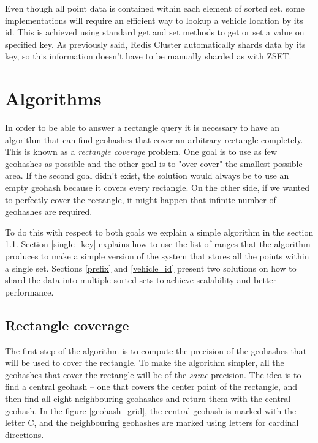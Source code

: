 \documentclass[times, utf8, diplomski]{fer}
\begin{document}
Even though all point data is contained within each element of sorted set, some implementations will require an efficient way to lookup a vehicle location by its id. This is achieved using standard get and set methods to get or set a value on specified key. As previously said, Redis Cluster automatically shards data by its key, so this information doesn't have to be manually sharded as with ZSET.

\chapter {Algorithms} \label {algorithms}
In order to be able to answer a rectangle query it is necessary to have an algorithm that can find geohashes that cover an arbitrary rectangle completely. This is known as a \emph{rectangle coverage} problem. One goal is to use as few geohashes as possible and the other goal is to "over cover" the smallest possible area. If the second goal didn't exist, the solution would always be to use an empty geohash because it covers every rectangle. On the other side, if we wanted to perfectly cover the rectangle, it might happen that infinite number of geohashes are required.

To do this with respect to both goals we explain a simple algorithm in the section \ref{rect_cov}.
Section \ref{single_key} explains how to use the list of ranges that the algorithm produces to make a simple version of the system that stores all the points within a single set. Sections \ref{prefix} and \ref{vehicle_id} present two solutions on how to shard the data into multiple sorted sets to achieve scalability and better performance.

\section {Rectangle coverage} \label {rect_cov}
The first step of the algorithm is to compute the precision of the geohashes that will be used to cover the rectangle. To make the algorithm simpler, all the geohashes that cover the rectangle will be of the \emph{same} precision.
The idea is to find a central geohash -- one that covers the center point of the rectangle, and then find all eight neighbouring geohashes and return them with the central geohash. In the figure \ref{geohash_grid}, the central geohash is marked with the letter C, and the neighbouring geohashes are marked using letters for cardinal directions.
\end{document}
